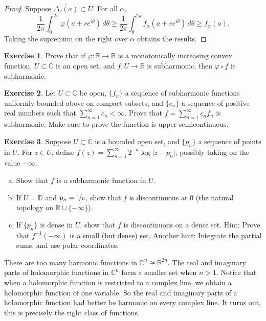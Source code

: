 \documentclass[12pt,openany]{book}
\newcommand{\sabs}[1]{\lvert {#1} \rvert}
\newcommand{\C}{{\mathbb{C}}}
\newcommand{\R}{{\mathbb{R}}}
\newcommand{\D}{{\mathbb{D}}}
\theoremstyle{plain}
\theoremstyle{remark}
\theoremstyle{definition}
\newenvironment{exbox}{%
    \def\FrameCommand{\vrule width 1pt \relax\hspace{10pt}}%
    \MakeFramed{\advance\hsize-\width\FrameRestore}%
}{%
    \endMakeFramed
}
\newenvironment{exparts}{%
    \leavevmode\begin{enumerate}[a),noitemsep,topsep=0pt,parsep=0pt,partopsep=0pt]
}{%
    \end{enumerate}
}
\theoremstyle{exercise}
\newtheorem{exercise}{Exercise}[section]
\theoremstyle{example}
\begin{document}
\begin{proof}
Suppose $\overline{\Delta_r(a)} \subset U$.  For all $\alpha$,
\begin{equation*}
\frac{1}{2\pi} \int_0^{2\pi} \varphi (a+re^{i\theta})\, d\theta
\geq
\frac{1}{2\pi} \int_0^{2\pi} f_\alpha (a+re^{i\theta})\, d\theta
\geq f_\alpha(a) .
\end{equation*}
Taking the supremum on the right over $\alpha$ obtains the results.
\end{proof}

\begin{exbox}
\begin{exercise}
Prove that if $\varphi \colon \R \to \R$ is a monotonically increasing
convex function, $U \subset \C$ is an open set, and $f \colon U \to \R$
is subharmonic, then $\varphi \circ f$ is subharmonic.
\end{exercise}

\begin{exercise}
Let $U \subset \C$ be open, $\{ f_n \}$ a sequence of
subharmonic functions uniformly bounded above on compact subsets, and
$\{ c_n \}$ a sequence of positive real numbers such that
$\sum_{n=1}^\infty c_n < \infty$.
Prove that $f = \sum_{n=1}^\infty c_n f_n$ is subharmonic.  Make sure to prove
the function is upper-semicontinuous.
\end{exercise}

\begin{exercise}
\pagebreak[2]%
Suppose $U \subset \C$ is a bounded open set, and $\{ p_n \}$ a sequence of points in
$U$. For $z \in U$, define
$f(z) = \sum_{n=1}^\infty 2^{-n} \log \sabs{z-p_n}$, possibly taking on the
value $-\infty$.
\begin{exparts}
\item
Show that $f$ is a subharmonic function in $U$.
\item
If $U = \D$ and $p_n = \nicefrac{1}{n}$, show that $f$ is discontinuous at 0
(the natural topology on $\R \cup \{ -\infty \}$).
\item
If $\{ p_n \}$ is dense in $U$, show that $f$
is discontinuous on a dense set.
Hint: Prove that $f^{-1}(-\infty)$ is a small (but dense) set.
Another hint: Integrate the partial sums, and use polar coordinates.
\end{exparts}
\end{exercise}
\end{exbox}

\pagebreak[2]
There are too many harmonic functions in $\C^n \cong \R^{2n}$.
The real and imaginary parts of holomorphic functions in $\C^n$
form a smaller set when $n > 1$.  Notice that when a holomorphic
function is restricted to a complex line, we obtain a holomorphic
function of one variable.  So the real and imaginary parts
of a holomorphic function had better be harmonic on every complex line.
It turns out, this is precisely the right class of functions.
\end{document}

